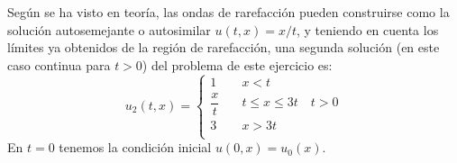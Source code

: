 \documentclass[12pt]{article}
\begin{document}
\begin{ejercicio}
        Según se ha visto en teoría, las ondas de rarefacción pueden construirse como la solución autosemejante o autosimilar $u(t,x) = x/t$,
        y teniendo en cuenta los límites ya obtenidos de la región de rarefacción, una segunda solución (en este caso continua para $t > 0$)
        del problema de este ejercicio es:
        $$\boxed{u_2(t,x) = \begin{cases}
            1 \quad& x < t \\
            \dfrac{x}{t} \quad& t \leq x \leq 3t \quad t > 0\\
            3 \quad& x > 3t \\
        \end{cases}}$$
        En $t=0$ tenemos la condición inicial $u(0,x) = u_0(x)$.
    \end{ejercicio}
    
\end{document}
